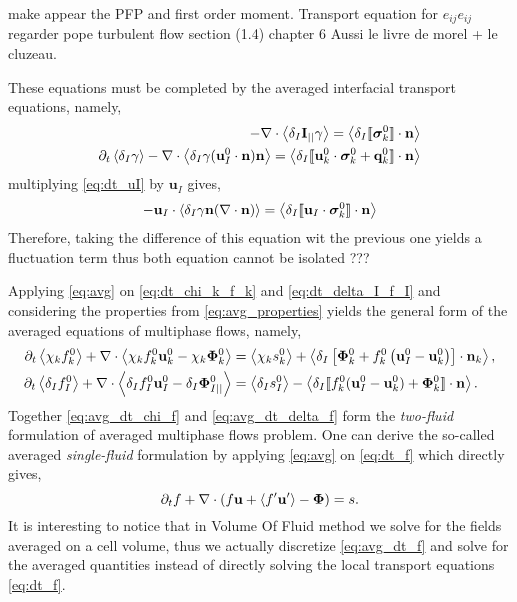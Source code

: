 make appear the PFP and first order moment.  
Transport equation for $e_{ij}e_{ij}$ regarder pope turbulent flow section (1.4) chapter 6 Aussi le livre de morel + le cluzeau. 

These equations must be completed by the averaged interfacial transport equations, namely,
\begin{align}
    \label{eq:dt_uI}
    - \mathbf{\nabla}\cdot \left<\delta_I \textbf{I}_{||} \gamma\right>
    = \left<\delta_I \llbracket \bm{\sigma}^0_k \rrbracket \cdot \textbf{n}\right>\\
    \label{eq:dt_gamma}
    \partial_t \left<\delta_I \gamma\right>
    - \mathbf{\nabla}\cdot \left<\delta_I \gamma (\textbf{u}_{I}^0 \cdot \textbf{n})\textbf{n} \right>
    = \left<\delta_I \llbracket \textbf{u}_k^0 \cdot \bm{\sigma}^0_k + \textbf{q}_k^0 \rrbracket \cdot \textbf{n}\right>\\
\end{align}
multiplying \ref{eq:dt_uI} by $\textbf{u}_I$ gives, 
\begin{align}
    - \textbf{u}_I \cdot \left<\delta_I  \gamma \textbf{n} (\mathbf{\nabla}\cdot \textbf{n})\right>
    = \left<\delta_I \llbracket \textbf{u}_I \cdot \bm{\sigma}^0_k \rrbracket \cdot \textbf{n}\right>\\
\end{align}
Therefore, taking the difference of this equation wit the previous one yields a fluctuation term thus both equation cannot be isolated  ??? 


Applying \ref{eq:avg} on \ref{eq:dt_chi_k_f_k} and \ref{eq:dt_delta_I_f_I} and considering the properties from \ref{eq:avg_properties} yields the general form of the averaged equations of multiphase flows, namely,
\begin{align}
    \partial_t \left<\chi_k f_k^0\right>
    +\mathbf{\nabla}\cdot \left<\chi_k f_k^0 \textbf{u}_k^0 - \chi_k \mathbf{\Phi}_k^0\right>
    &= 
    \left<\chi_k s_k^0\right>
    + \left<\delta_I\left[
        \mathbf{\Phi}_k^0
        + f_k^0
        \left(
            \textbf{u}_I^0
            - \textbf{u}_k^0
        \right)
    \right]
    \cdot \textbf{n}_k\right> ,
    \label{eq:avg_dt_chi_f}\\
    \partial_t \left<\delta_If_I^0\right>
    +\mathbf{\nabla}\cdot \left<\delta_I f_I^0 \textbf{u}_I^0-\delta_I \mathbf{\Phi}_{I||}^0 \right>
    &= 
    \left<\delta_Is_I^0\right> 
    - \left<\delta_I \llbracket 
    f_k^0 (\textbf{u}_I^0 - \textbf{u}_k^0)
    + \mathbf{\Phi}_k^0
     \rrbracket \cdot \textbf{n} \right>.
    \label{eq:avg_dt_delta_f}
\end{align}
Together \ref{eq:avg_dt_chi_f}  and \ref{eq:avg_dt_delta_f} form the \textit{two-fluid} formulation of averaged multiphase flows problem. 
One can derive the so-called averaged \textit{single-fluid} formulation by applying \ref{eq:avg} on \ref{eq:dt_f} which directly gives, 
\begin{equation}
    \partial_t f
    + \mathbf{\nabla}\cdot (f \textbf{u} + \left<f'\textbf{u}'\right> - \mathbf{\Phi})
    = 
    s.
    \label{eq:avg_dt_f}
\end{equation}
It is interesting to notice that in Volume Of Fluid method we solve for the fields averaged on a cell volume, thus we actually discretize \ref{eq:avg_dt_f} and solve for the averaged quantities \citep{popinet2018numerical,tryggvason2011direct} instead of directly solving the local transport equations \ref{eq:dt_f}.


